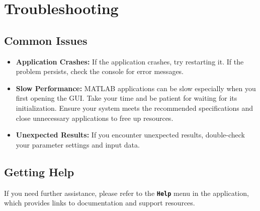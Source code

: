 \chapter{Troubleshooting}\label{ch:troubleshooting}

\section{Common Issues}
\begin{itemize}
    \item \textbf{Application Crashes:} If the application crashes, try restarting it. If the problem persists, check the console for error messages.
    \item \textbf{Slow Performance:} MATLAB applications can be slow especially when you first opening the GUI. Take your time and be patient for waiting for its initialization. Ensure your system meets the recommended specifications and close unnecessary applications to free up resources.
    \item \textbf{Unexpected Results:} If you encounter unexpected results, double-check your parameter settings and input data.
\end{itemize}

\section{Getting Help}
If you need further assistance, please refer to the \textbf{\texttt{Help}} menu in the application, which provides links to documentation and support resources.
